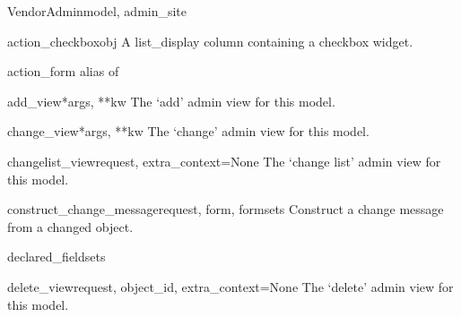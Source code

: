 \documentclass[letterpaper,10pt,english]{sphinxmanual}
\begin{document}
\hypertarget{data.admin.VendorAdmin}{}\begin{classdesc}{VendorAdmin}{model, admin\_site}~

\hypertarget{data.admin.VendorAdmin.action_checkbox}{}\begin{methoddesc}{action\_checkbox}{obj}
A list\_display column containing a checkbox widget.
\end{methoddesc}

\hypertarget{data.admin.VendorAdmin.action_form}{}\begin{memberdesc}{action\_form}
alias of 
\end{memberdesc}

\hypertarget{data.admin.VendorAdmin.add_view}{}\begin{methoddesc}{add\_view}{*args, **kw}
The `add' admin view for this model.
\end{methoddesc}

\hypertarget{data.admin.VendorAdmin.change_view}{}\begin{methoddesc}{change\_view}{*args, **kw}
The `change' admin view for this model.
\end{methoddesc}

\hypertarget{data.admin.VendorAdmin.changelist_view}{}\begin{methoddesc}{changelist\_view}{request, extra\_context=None}
The `change list' admin view for this model.
\end{methoddesc}

\hypertarget{data.admin.VendorAdmin.construct_change_message}{}\begin{methoddesc}{construct\_change\_message}{request, form, formsets}
Construct a change message from a changed object.
\end{methoddesc}

\hypertarget{data.admin.VendorAdmin.declared_fieldsets}{}\begin{memberdesc}{declared\_fieldsets}\end{memberdesc}

\hypertarget{data.admin.VendorAdmin.delete_view}{}\begin{methoddesc}{delete\_view}{request, object\_id, extra\_context=None}
The `delete' admin view for this model.
\end{methoddesc}


\end{classdesc}
\end{document}
